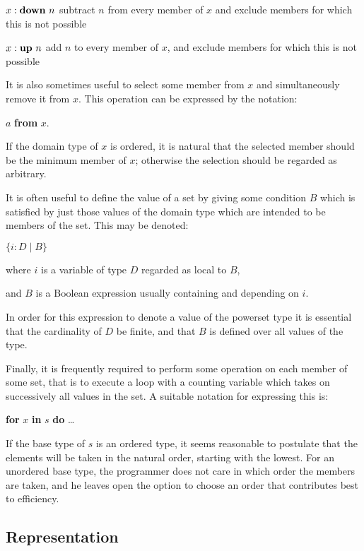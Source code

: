 \noindent
{}\parindent$x:\text{\textbf{down} }n$ \tabto*{5em} subtract $n$ from every member of $x$ and exclude members for which this is not possible

\noindent
{}\parindent$x:\text{\textbf{up} } n$ \tabto*{5em} add $n$ to every member of $x$, and exclude members for which this is not possible

\noindent
It is also sometimes useful to select some member from $x$ and simultaneously remove it from $x$. This operation can be expressed by the notation:

\quad $a$ \textbf{from} $x$.

\noindent
If the domain type of $x$ is ordered, it is natural that the selected member should be the minimum member of $x$; otherwise the selection should be regarded as arbitrary.

It is often useful to define the value of a set by giving some condition $B$ which is satisfied by just those values of the domain type which are intended to be members of the set. This may be denoted:

\quad $\{i:D \mid B\}$

\noindent
where \tabto*{4em} $i$ is a variable of type $D$ regarded as local to $B$,

\noindent
and \tabto*{4em} $B$ is a Boolean expression usually containing and depending on $i$.

\noindent
In order for this expression to denote a value of the powerset type it is essential that the cardinality of $D$ be finite, and that $B$ is defined over all values of the type.

Finally, it is frequently required to perform some operation on each member of some set, that is to execute a loop with a counting variable which takes on successively all values in the set. A suitable notation for expressing this is:

\quad \textbf{for} $x$ \textbf{in} $s$ \textbf{do} \dots

\noindent
If the base type of $s$ is an ordered type, it seems reasonable to postulate that the elements will be taken in the natural order, starting with the lowest. For an unordered base type, the programmer does not care in which order the members are taken, and he leaves open the option to choose an order that contributes best to efficiency.

\subsection{Representation}

